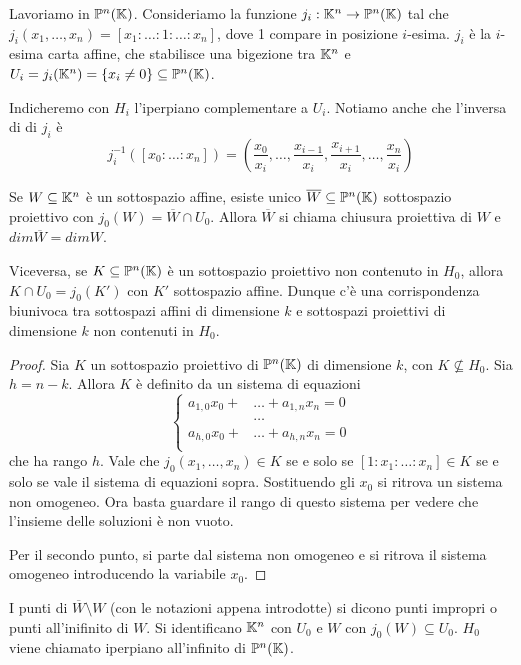 {
\newcommand{\pro}{\P^n(\K)}
\renewcommand{\dim}{\text{dim}}

Lavoriamo in $\mathbb{P}^n(\mathbb{K})$. Consideriamo la funzione $j_i:\mathbb{K}^n \rightarrow
\mathbb{P}^n(\mathbb{K})$ tal che $j_i(x_1,\dots, x_n)=[x_1:\dots:1:\dots:x_n]$, dove 1 compare
in posizione $i$-esima. $j_i$ \`e la $i$-esima carta affine, che stabilisce una
bigezione tra $\mathbb{K}^n$ e $U_i = j_i(\mathbb{K}^n)=\{x_i\neq 0\}\subseteq \mathbb{P}^n(\mathbb{K})$.

Indicheremo con $H_i$ l'iperpiano complementare a $U_i$. Notiamo anche che
l'inversa di di $j_i$ \`e
\[
    j_i^{-1}([x_0:\dots:x_n])=(\frac{x_0}{x_i},\dots,\frac{x_{i-1}}{x_i},
    \frac{x_{i+1}}{x_i}, \dots, \frac{x_n}{x_i})
\]

\begin{prop}
    Se $W\subseteq \mathbb{K}^n$ \`e un sottospazio affine, esiste unico
    $\overline{W}\subseteq \mathbb{P}^n(\mathbb{K})$ sottospazio proiettivo con $j_0(W) =
    \overline{W} \cap U_0$. Allora $\overline{W}$ si chiama chiusura proiettiva
    di $W$ e $dim \overline{W} = dim W$.

    Viceversa, se $K\subseteq \mathbb{P}^n(\mathbb{K})$ \`e un sottospazio proiettivo non
    contenuto in $H_0$, allora $K\cap U_0 = j_0(K')$ con $K'$ sottospazio affine.
    Dunque c'\`e una corrispondenza biunivoca tra sottospazi affini di
    dimensione $k$ e sottospazi proiettivi di dimensione $k$ non contenuti in
    $H_0$.
\end{prop}
\begin{proof}
    Sia $K$ un sottospazio proiettivo di $\pro$ di dimensione $k$, con $K
    \not\subseteq H_0$. Sia $h=n-k$.  Allora $K$ \`e definito da un sistema di
    equazioni
    \[
    \begin{cases}
        a_{1,0}x_0+&\dots+a_{1,n}x_n=0 \\
        &\dots\\
        a_{h,0}x_0+&\dots+a_{h,n}x_n=0 \\
    \end{cases}
    \]
    che ha rango $h$. Vale che $j_0(x_1,\dots,x_n)\in K$ se e solo se
    $[1:x_1:\dots:x_n]\in K$ se e solo se vale il sistema di equazioni sopra.
    Sostituendo gli $x_0$ si ritrova un sistema non omogeneo. Ora basta guardare
    il rango di questo sistema per vedere che l'insieme delle soluzioni \`e non
    vuoto.

    Per il secondo punto, si parte dal sistema non omogeneo e si ritrova il
    sistema omogeneo introducendo la variabile $x_0$.
\end{proof}

\begin{defn}
    I punti di $\overline{W}\setminus W$ (con le notazioni appena introdotte) si
    dicono punti impropri o punti all'inifinito di $W$. Si identificano $\mathbb{K}^n$
    con $U_0$ e $W$ con $j_0(W)\subseteq U_0$. $H_0$ viene chiamato iperpiano
    all'infinito di $\pro$. 
\end{defn}
}
